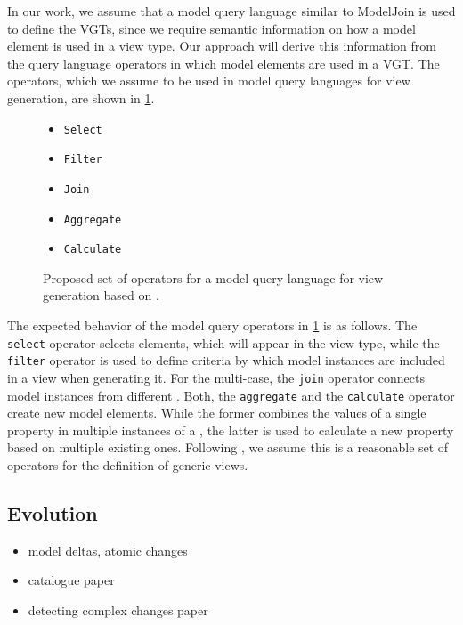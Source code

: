 In our work, we assume that a model query language similar to ModelJoin is used to define the VGTs, since we require semantic information on how a model element is used in a view type.
Our approach will derive this information from the query language operators in which model elements are used in a VGT.
The operators, which we assume to be used in model query languages for view generation, are shown in \cref{fig:model-query-operators}.

\begin{figure}[h]
    \begin{itemize}
        \item \texttt{Select}
        \item \texttt{Filter}
        \item \texttt{Join}
        \item \texttt{Aggregate}
        \item \texttt{Calculate}
    \end{itemize}

    \caption{Proposed set of operators for a model query language for view generation based on \textcite{burger_model-join_2016}.}
    \label{fig:model-query-operators}
\end{figure}

The expected behavior of the model query operators in \cref{fig:model-query-operators} is as follows.
The \texttt{select} operator selects \metamodel elements, which will appear in the view type, while the \texttt{filter} operator is used to define criteria by which model instances are included in a view when generating it.
For the multi-\metamodel case, the \texttt{join} operator connects model instances from different \metamodels.
Both, the \texttt{aggregate} and the \texttt{calculate} operator create new model elements.
While the former combines the values of a single property in multiple instances of a \metaclass, the latter is used to calculate a new property based on multiple existing ones.
Following \textcite{burger_model-join_2016}, we assume this is a reasonable set of operators for the definition of generic views.

\subsection{\Metamodel Evolution}
\label{sec:MetaModelEvolution}

\begin{itemize}
    \item model deltas, atomic changes
    \item catalogue paper
    \item detecting complex changes paper
\end{itemize}
